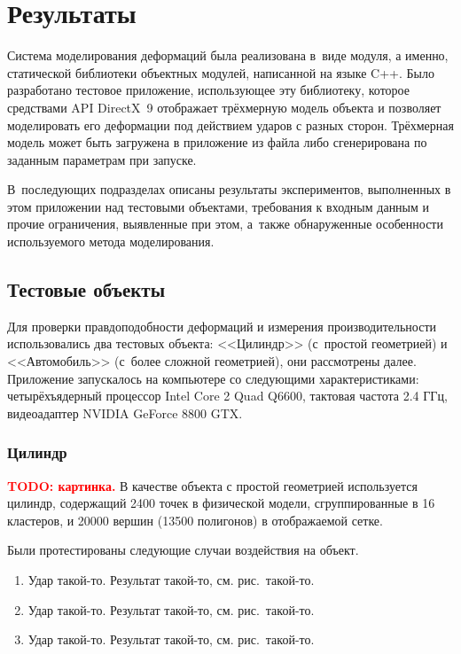 \documentclass[a4paper, 14pt, titlepage]{extarticle}
\newcommand{\todo}[1]{\textbf{\textcolor{red}{TODO: #1}}}
\let\oldsection\section
\renewcommand{\section}{\newpage\oldsection}
\begin{document}
  \section{Результаты}\label{sec:results}

    Система моделирования деформаций была реализована в~виде модуля, а именно, статической
    библиотеки объектных модулей, написанной на языке C++. Было разработано тестовое приложение,
    использующее эту библиотеку, которое средствами API DirectX~9 отображает трёхмерную модель
    объекта и позволяет моделировать его деформации под действием ударов с разных сторон. Трёхмерная
    модель может быть загружена в приложение из файла либо сгенерирована по заданным параметрам при
    запуске.

    В~последующих подразделах описаны результаты экспериментов, выполненных в этом приложении над
    тестовыми объектами, требования к входным данным и прочие ограничения, выявленные при этом,
    а~также обнаруженные особенности используемого метода моделирования.

    \subsection{Тестовые объекты}

      Для проверки правдоподобности деформаций и измерения производительности использовались два
      тестовых объекта: <<Цилиндр>> (с~простой геометрией) и <<Автомобиль>> (с~более сложной
      геометрией), они рассмотрены далее. Приложение запускалось на компьютере со следующими
      характеристиками: четырёхъядерный процессор Intel Core 2 Quad Q6600, тактовая частота 2.4 ГГц,
      видеоадаптер NVIDIA GeForce 8800 GTX.

      \subsubsection{Цилиндр}\label{sssec:cylinder}

        \todo{картинка.} В качестве объекта с простой геометрией используется цилиндр, содержащий
        2400 точек в физической модели, сгруппированные в 16 кластеров, и 20000 вершин (13500
        полигонов) в отображаемой сетке.

        Были протестированы следующие случаи воздействия на объект.
        \begin{enumerate}
          \item Удар такой-то. Результат такой-то, см. рис.~такой-то.
          \item Удар такой-то. Результат такой-то, см. рис.~такой-то.
          \item Удар такой-то. Результат такой-то, см. рис.~такой-то.
        \end{enumerate}
\end{document}
